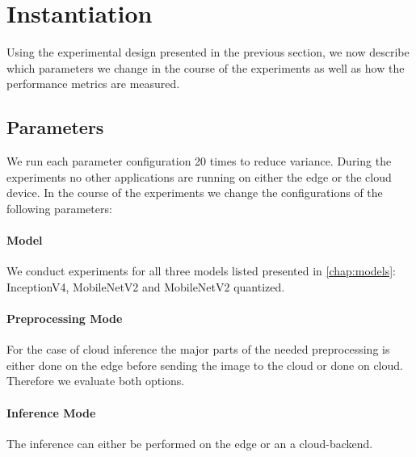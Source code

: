 \section{Instantiation}
Using the experimental design presented in the previous section, we now describe which parameters we change in the course of the experiments as well as how the performance metrics are measured.
\subsection{Parameters}
We run each parameter configuration 20 times to reduce variance. During the experiments no other applications are running on either the edge or the cloud device.
In the course of the experiments we change the configurations of the following parameters:
\paragraph{Model}
We conduct experiments for all three models listed presented in \ref{chap:models}: InceptionV4, MobileNetV2 and MobileNetV2 quantized.

\paragraph{Preprocessing Mode}
For the case of cloud inference the major parts of the needed preprocessing is either done on the edge before sending the image to the cloud or done on cloud. Therefore we evaluate both options.
\paragraph{Inference Mode}
The inference can either be performed on the edge or an a cloud-backend.

